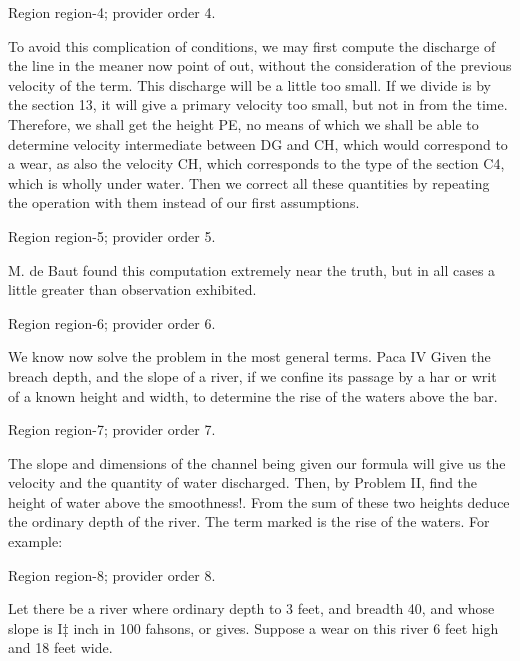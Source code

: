 \documentclass[11pt]{article}
\begin{document}
{\scriptsize\color{gray} Region region-4; provider order 4.\par}
\medskip

To avoid this complication of conditions, we may first compute the discharge of the line in the meaner now point of out, without the consideration of the previous velocity of the term. This discharge will be a little too small. If we divide is by the section 13, it will give a primary velocity too small, but not in from the time. Therefore, we shall get the height PE, no means of which we shall be able to determine velocity intermediate between DG and CH, which would correspond to a wear, as also the velocity CH, which corresponds to the type of the section C4, which is wholly under water. Then we correct all these quantities by repeating the operation with them instead of our first assumptions.
\par

{\scriptsize\color{gray} Region region-5; provider order 5.\par}
\medskip

M. de Baut found this computation extremely near the truth, but in all cases a little greater than observation exhibited.
\par

{\scriptsize\color{gray} Region region-6; provider order 6.\par}
\medskip

We know now solve the problem in the most general terms. Paca IV Given the breach depth, and the slope of a river, if we confine its passage by a har or writ of a known height and width, to determine the rise of the waters above the bar.
\par

{\scriptsize\color{gray} Region region-7; provider order 7.\par}
\medskip

The slope and dimensions of the channel being given our formula will give us the velocity and the quantity of water discharged. Then, by Problem II, find the height of water above the smoothness!. From the sum of these two heights deduce the ordinary depth of the river. The term marked is the rise of the waters. For example:
\par

{\scriptsize\color{gray} Region region-8; provider order 8.\par}
\medskip

Let there be a river where ordinary depth to 3 feet, and breadth 40, and whose slope is I‡ inch in 100 fahsons, or gives. Suppose a wear on this river 6 feet high and 18 feet wide.
\par
\end{document}
